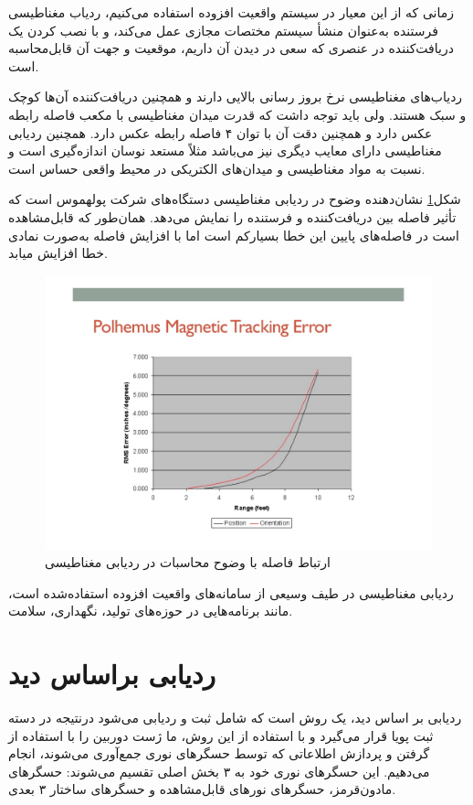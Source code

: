 زمانی که از این معیار در سیستم واقعیت افزوده استفاده می‌کنیم، ردیاب مغناطیسی فرستنده به‌عنوان منشأ سیستم مختصات مجازی عمل می‌کند، و با نصب کردن یک دریافت‌کننده در عنصری که سعی در دیدن آن داریم، موقعیت و جهت آن قابل‌محاسبه است\cite{lhachemi2019augmented}. 

ردیاب‌های مغناطیسی نرخ بروز رسانی بالایی دارند و همچنین دریافت‌کننده آن‌ها کوچک و سبک هستند. ولی باید توجه داشت که قدرت میدان مغناطیسی با مکعب فاصله رابطه عکس دارد و همچنین دقت آن با توان ۴ فاصله رابطه عکس دارد. همچنین ردیابی مغناطیسی دارای معایب دیگری نیز می‌باشد مثلاً مستعد نوسان اندازه‌گیری است و نسبت به مواد مغناطیسی و میدان‌های الکتریکی در محیط واقعی حساس است.

شکل\ref{fig:magnetic} نشان‌دهنده وضوح در ردیابی مغناطیسی دستگاه‌های شرکت پولهموس است که تأثیر فاصله بین دریافت‌کننده و فرستنده را نمایش می‌دهد. همان‌طور که قابل‌مشاهده است در فاصله‌های پایین این خطا بسیارکم است اما با افزایش فاصله به‌صورت نمادی خطا افزایش میابد.
\begin{figure}
	\centering
	\includegraphics[width=1\linewidth]{image/magnetic}
	\caption {ارتباط فاصله با وضوح محاسبات در ردیابی مغناطیسی\cite{Polhemus}}
	\label{fig:magnetic}
\end{figure}
ردیابی مغناطیسی در طیف وسیعی از سامانه‌های واقعیت افزوده استفاده‌شده است، مانند برنامه‌هایی در حوزه‌های تولید\cite{lhachemi2019augmented}، نگهداری\cite{siew2019practical}، سلامت\cite{ribeiro2019augmented}.
\section{ردیابی براساس دید}
ردیابی بر اساس دید، یک روش است که شامل ثبت و ردیابی می‌شود درنتیجه در دسته ثبت پویا قرار می‌گیرد و با استفاده از این روش، ما ژست دوربین را با استفاده از گرفتن و پردازش اطلاعاتی که توسط حسگرهای نوری جمع‌آوری می‌شوند، انجام می‌دهیم. این حسگرهای نوری خود به ۳ بخش اصلی تقسیم می‌شوند: حسگرهای مادون‌قرمز، حسگرهای نورهای قابل‌مشاهده و حسگرهای ساختار ۳ بعدی.

